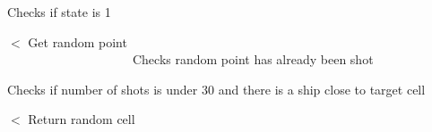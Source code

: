 Checks if state is 1

$<$ Get random point ~\newline
~\newline
~\newline
~\newline
~\newline
~\newline
~\newline
~\newline
~\newline
~\newline
~\newline
~\newline
~\newline
~\newline
~\newline
~\newline
~\newline
~\newline
~\newline
~\newline
~\newline
~\newline
~\newline
~\newline
~\newline
~\newline
~\newline
~\newline
~\newline
~\newline
~\newline
~\newline
~\newline
~\newline
~\newline
~\newline
~\newline
~\newline
~\newline
~\newline
~\newline
~\newline
~\newline
 Checks random point has already been shot

Checks if number of shots is under 30 and there is a ship close to target cell

$<$ Return random cell

